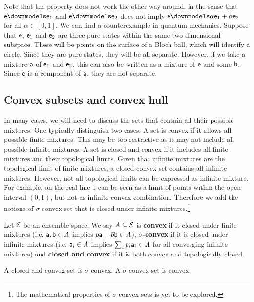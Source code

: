 \begin{mathSection}
\begin{remark}
	Note that the property does not work the other way around, in the sense that $\ens \separate \ens_1$ and $\ens \separate \ens_2$ does not imply $\ens \separate \alpha \ens_1 + \bar{\alpha} \ens_2$ for all $\alpha \in [0, 1]$. We can find a counterexample in quantum mechanics. Suppose that $\ens$, $\ens_1$ and $\ens_2$ are three pure states within the same two-dimensional subspace. These will be points on the surface of a Bloch ball, which will identify a circle. Since they are pure states, they will be all separate. However, if we take a mixture $\ens[a]$ of $\ens_1$ and $\ens_2$, this can also be written as a mixture of $\ens$ and some $\ens[b]$. Since $\ens$ is a component of $\ens[a]$, they are not separate.
\end{remark}
\end{mathSection}

\subsection{Convex subsets and convex hull}

In many cases, we will need to discuss the sets that contain all their possible mixtures. One typically distinguish two cases. A set is convex if it allows all possible finite mixtures. This may be too restrictive as it may not include all possible infinite mixtures. A set is closed and convex if it includes all finite mixtures and their topological limits. Given that infinite mixtures are the topological limit of finite mixtures, a closed convex set contains all infinite mixtures. However, not all topological limits can be expressed as infinite mixture. For example, on the real line $1$ can be seen as a limit of points within the open interval $(0,1)$, but not as infinite convex combination. Therefore we add the notions of $\sigma$-convex set that is closed under infinite mixtures.\footnote{The mathematical properties of $\sigma$-convex sets is yet to be explored.}

\begin{mathSection}
\begin{defn}
	Let $\Ens$ be an ensemble space. We say $A \subseteq \Ens$ is \textbf{convex} if it closed under finite mixtures (i.e. $\ens[a],\ens[b] \in A$ implies $p\ens[a] + \bar{p} \ens[b] \in A$), \textbf{$\sigma$-convex} if it is closed under infinite mixtures (i.e. $\ens[a]_i \in A$ implies $\sum_i p_i \ens[a]_i \in A$ for all converging infinite mixtures) and \textbf{closed and convex} if it is both convex and topologically closed.
\end{defn}

\begin{coro}
	A closed and convex set is $\sigma$-convex. A $\sigma$-convex set is convex.
\end{coro}
\end{mathSection}

